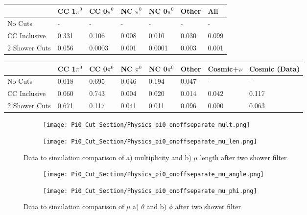 \begin{table}[H]
\centering
{}
 \begin{tabular}{| l | l | l |l|l|l|l|}
 \hline
 & CC 1$\pi^0$ & CC 0$\pi^0$ & NC $\pi^0$ & NC 0$\pi^0$ & Other & All \\ [0.1ex] \hline
No Cuts & - & - & - & - & - & -\\
CC Inclusive & 0.331 & 0.106 & 0.008 & 0.010 & 0.030 & 0.099 \\ 
2 Shower Cuts & 0.056 & 0.0003 & 0.001 & 0.0001 & 0.003 & 0.001 \\ \hline
\end{tabular}
\end{table}

\begin{table}[H]
\centering
{}
 \begin{tabular}{| l | l | l |l|l|l|l|l|}
 \hline
  & CC 1$\pi^0$ & CC 0$\pi^0$ & NC $\pi^0$ & NC 0$\pi^0$ & Other& Cosmic+$\nu$& Cosmic (Data) \\ [0.1ex] \hline
No Cuts  & 0.018 &  0.695 & 0.046 & 0.194  & 0.047 & -&-\\
CC Inclusive & 0.060 & 0.743 & 0.004 & 0.020 & 0.014 & 0.042 & 0.117  \\ 
2 Shower Cuts  & 0.671 & 0.117 & 0.041 & 0.011 & 0.096 & 0.000 & 0.063 \\ \hline
\end{tabular}
\end{table}

\begin{figure}[H]
  \begin{subfigure}[t]{0.4\textwidth}
\texttt{[image: Pi0\_Cut\_Section/Physics\_pi0\_onoffseparate\_mult.png]}
  \caption{ }
  \end{subfigure} 
  \hspace{20mm}
  \begin{subfigure}[t]{0.4\textwidth}
    \texttt{[image: Pi0\_Cut\_Section/Physics\_pi0\_onoffseparate\_mu\_len.png]}
  \caption{ }
  \end{subfigure} 
  \caption{ Data to simulation comparison of a) multiplicity and b) $\mu$ length after two shower filter }
\label{fig:physics_pi0_mu_len}
\end{figure}

\begin{figure}[H]
  \begin{subfigure}[t]{0.3\textwidth}
\texttt{[image: Pi0\_Cut\_Section/Physics\_pi0\_onoffseparate\_mu\_angle.png]}
  \caption{ }
  \end{subfigure} 
  \hspace{15mm}
  \begin{subfigure}[t]{0.3\textwidth}
\texttt{[image: Pi0\_Cut\_Section/Physics\_pi0\_onoffseparate\_mu\_phi.png]}
  \caption{ }
  \end{subfigure} 
\caption{ Data to simulation comparison of $\mu$ a) $\theta$ and b) $\phi$ after two shower filter }

\label{fig:physics_pi0_mu_phi}
\end{figure}

